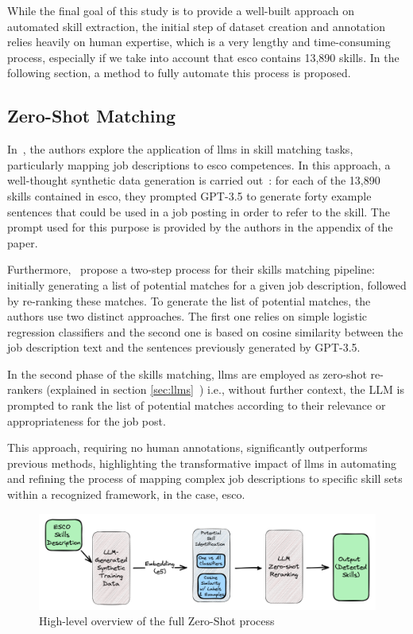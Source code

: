 While the final goal of this study is to provide a well-built approach on automated skill extraction, the initial step of dataset creation and annotation relies heavily on human expertise, which is a very lengthy and time-consuming process, especially if we take into account that \ac{esco} contains 13,890 skills. In the following section, a method to fully automate this process is proposed.


\subsection{Zero-Shot Matching}
In~, the authors explore the application of \ac{llms} in skill matching tasks, particularly mapping job descriptions to \ac{esco} competences. In this approach, a well-thought synthetic data generation is carried out~\cite{clavié2023large}: for each of the 13,890 skills contained in \ac{esco}, they prompted GPT-3.5 to generate forty example sentences that could be used in a job posting in order to refer to the skill. The prompt used for this purpose is provided by the authors in the appendix of the paper.  

Furthermore,~\citeauthor{clavié2023large} propose a two-step process for their skills matching pipeline: initially generating a list of potential matches for a given job description, followed by re-ranking these matches. 
To generate the list of potential matches, the authors use two distinct approaches. The first one relies on simple logistic regression classifiers and the second one is based on cosine similarity between the job description text and the sentences previously generated by GPT-3.5.

In the second phase of the skills matching, \ac{llms} are employed as zero-shot re-rankers (explained in section \ref{sec:llms}~\cite{prompt_engineering}) i.e., without further context, the LLM is prompted to rank the list of potential matches according to their relevance or appropriateness for the job post. 

This approach, requiring no human annotations, significantly outperforms previous methods, highlighting the transformative impact of \ac{llms} in automating and refining the process of mapping complex job descriptions to specific skill sets within a recognized framework, in the case, \ac{esco}.

\begin{figure}[H]
    \centering
    \includegraphics[width=15cm]{figs/zero_shot_process.png}
    \caption{High-level overview of the full Zero-Shot process~\cite{clavié2023large}}
    \label{fig:zero_shot_process}
\end{figure}


